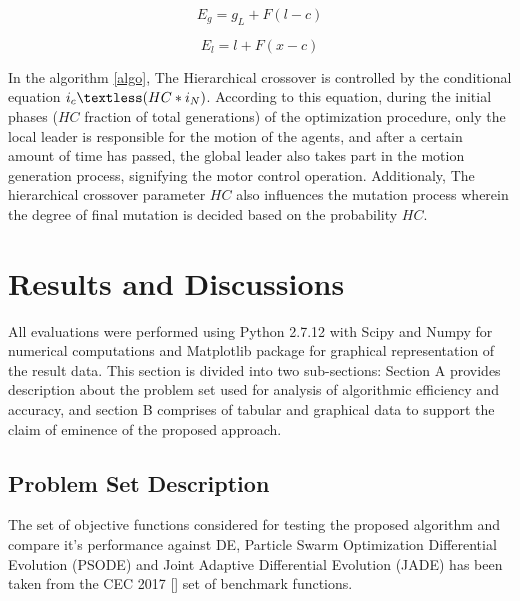 \begin{equation}
\label{one}
E_g = g_L + F (l - c)
\end{equation}

\begin{equation}
\label{two}
E_l = l + F (x - c)
\end{equation}



In the algorithm \ref{algo}, The Hierarchical crossover is controlled by the conditional equation $i_c \textless (HC*i_N)$. According to this equation, during the initial phases ($HC$ fraction of total generations) of the optimization procedure, only the local leader is responsible for the motion of the agents, and after a certain amount of time has passed, the global leader also takes part in the motion generation process, signifying the motor control operation.
Additionaly, The hierarchical crossover parameter $HC$ also influences the mutation process wherein the degree of final mutation is decided based on the probability $HC$.

\section{Results and Discussions}

All evaluations were performed using Python 2.7.12 with Scipy and Numpy for numerical computations and Matplotlib package for graphical representation of the result data. This section is divided into two sub-sections: Section A provides description about the problem set used for analysis of algorithmic efficiency and accuracy, and section B comprises of tabular and graphical data to support the claim of eminence of the proposed approach.

\subsection{Problem Set Description}

The set of objective functions considered for testing the proposed algorithm and compare it's performance against DE, Particle Swarm Optimization Differential Evolution (PSODE) and Joint Adaptive Differential Evolution (JADE) has been taken from the CEC 2017 [] set of benchmark functions.






%

